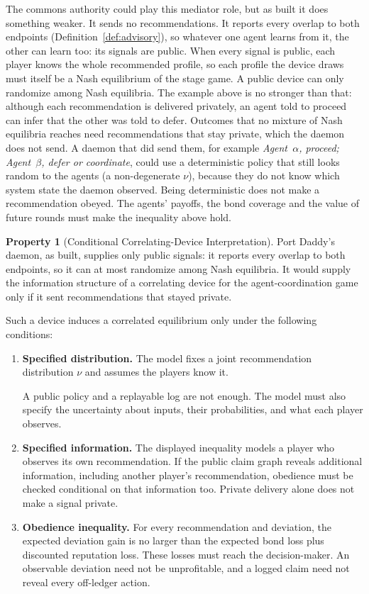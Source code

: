 \documentclass[11pt,a4paper]{article}
\theoremstyle{definition}
\newtheorem{property}{Property}[section]
\theoremstyle{remark}
\begin{document}
The commons authority could play this mediator role, but as built it does something weaker. It sends no recommendations. It reports every overlap to both endpoints (Definition~\ref{def:advisory}), so whatever one agent learns from it, the other can learn too: its signals are public. When every signal is public, each player knows the whole recommended profile, so each profile the device draws must itself be a Nash equilibrium of the stage game. A public device can only randomize among Nash equilibria. The example above is no stronger than that: although each recommendation is delivered privately, an agent told to proceed can infer that the other was told to defer. Outcomes that no mixture of Nash equilibria reaches need recommendations that stay private, which the daemon does not send. A daemon that did send them, for example \emph{Agent~$\alpha$, proceed; Agent~$\beta$, defer or coordinate}, could use a deterministic policy that still looks random to the agents (a non-degenerate $\nu$), because they do not know which system state the daemon observed. Being deterministic does not make a recommendation obeyed. The agents' payoffs, the bond coverage and the value of future rounds must make the inequality above hold.

\begin{property}[Conditional Correlating-Device Interpretation]\label{prop:correlating-device}
\setlength{\parskip}{4pt plus 1pt}
Port Daddy's daemon, as built, supplies only public signals: it reports every overlap to both endpoints, so it can at most randomize among Nash equilibria. It would supply the information structure of a correlating device for the agent-coordination game only if it sent recommendations that stayed private.

Such a device induces a correlated equilibrium only under the following conditions:
\begin{enumerate}[nosep]
  \item \textbf{Specified distribution.} The model fixes a joint recommendation distribution $\nu$ and assumes the players know it.

A public policy and a replayable log are not enough. The model must also specify the uncertainty about inputs, their probabilities, and what each player observes.
  \item \textbf{Specified information.} The displayed inequality models a player who observes its own recommendation. If the public claim graph reveals additional information, including another player's recommendation, obedience must be checked conditional on that information too. Private delivery alone does not make a signal private.
  \item \textbf{Obedience inequality.} For every recommendation and deviation, the expected deviation gain is no larger than the expected bond loss plus discounted reputation loss. These losses must reach the decision-maker. An observable deviation need not be unprofitable, and a logged claim need not reveal every off-ledger action.
\end{enumerate}
\end{property}
\end{document}
